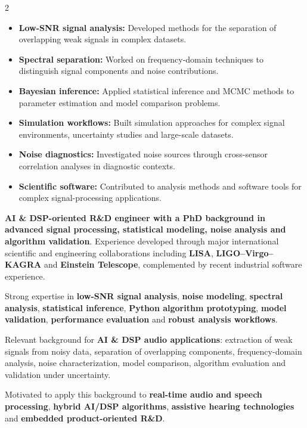 \documentclass[8pt,a4paper,ragged2e,withhyper]{altacv}
\begin{document}
\begin{paracol}{2}
\begin{itemize}
\item \textbf{Low-SNR signal analysis:} Developed methods for the separation of overlapping weak signals in complex datasets.
\item \textbf{Spectral separation:} Worked on frequency-domain techniques to distinguish signal components and noise contributions.
\item \textbf{Bayesian inference:} Applied statistical inference and MCMC methods to parameter estimation and model comparison problems.
\item \textbf{Simulation workflows:} Built simulation approaches for complex signal environments, uncertainty studies and large-scale datasets.
\item \textbf{Noise diagnostics:} Investigated noise sources through cross-sensor correlation analyses in diagnostic contexts.
\item \textbf{Scientific software:} Contributed to analysis methods and software tools for complex signal-processing applications.
\end{itemize}

\switchcolumn


\textbf{AI \& DSP-oriented R\&D engineer with a PhD background in advanced signal processing, statistical modeling, noise analysis and algorithm validation}. Experience developed through major international scientific and engineering collaborations including \textbf{LISA}, \textbf{LIGO--Virgo--KAGRA} and \textbf{Einstein Telescope}, complemented by recent industrial software experience.

Strong expertise in \textbf{low-SNR signal analysis}, \textbf{noise modeling}, \textbf{spectral analysis}, \textbf{statistical inference}, \textbf{Python algorithm prototyping}, \textbf{model validation}, \textbf{performance evaluation} and \textbf{robust analysis workflows}.

Relevant background for \textbf{AI \& DSP audio applications}: extraction of weak signals from noisy data, separation of overlapping components, frequency-domain analysis, noise characterization, model comparison, algorithm evaluation and validation under uncertainty.

Motivated to apply this background to \textbf{real-time audio and speech processing}, \textbf{hybrid AI/DSP algorithms}, \textbf{assistive hearing technologies} and \textbf{embedded product-oriented R\&D}.


\end{paracol}
\end{document}
